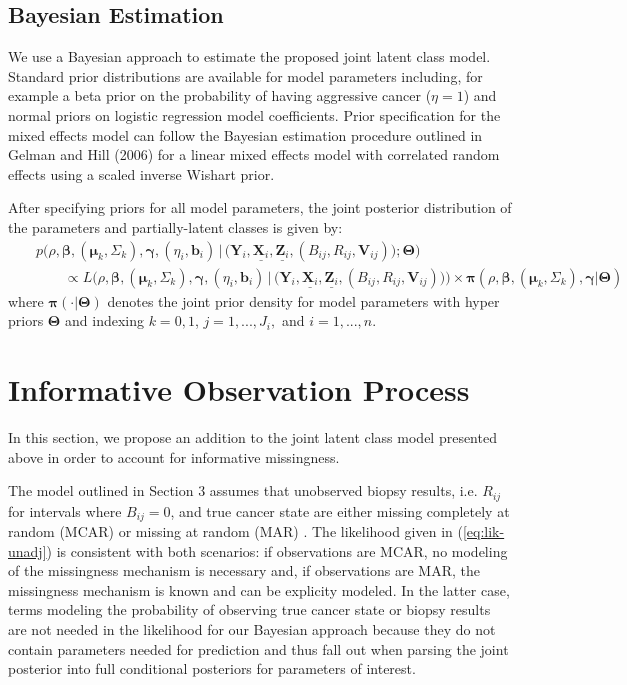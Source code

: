 \documentclass[12pt, letterpaper]{article}
\newcommand{\bmbeta}{\boldsymbol{\beta}}
\newcommand{\bmpi}{\boldsymbol{\pi}}
\newcommand{\bmmu}{\boldsymbol{\mu}}
\newcommand{\bmgamma}{\boldsymbol{\gamma}}
\newcommand{\bmY}{\mathbf{Y}}
\newcommand{\bmZ}{\mathbf{Z}}
\newcommand{\bmX}{\mathbf{X}}
\newcommand{\bmV}{\mathbf{V}}
\newcommand{\bmb}{\mathbf{b}}
\newcommand{\bmTheta}{\boldsymbol{\Theta}}
\newcommand{\beas}{\begin{eqnarray*}}
\newcommand{\eeas}{\end{eqnarray*}}
\newcommand{\mydots}{...}
\begin{document}
\subsection{Bayesian Estimation}

We use a Bayesian approach to estimate the proposed joint latent class model. Standard prior distributions are available for model parameters including, for example a beta prior on the probability of having aggressive cancer ($\eta=1$) and normal priors on logistic regression model coefficients. Prior specification for the mixed effects model can follow the Bayesian estimation procedure outlined in Gelman and Hill (2006) for a linear mixed effects model with correlated random effects using a scaled inverse Wishart prior\nocite{Gelman2006}. %

After specifying priors for all model parameters, the joint posterior distribution of the parameters and partially-latent classes is given by:
\beas
&& p\Big(\rho, \bmbeta, (\bmmu_k,\Sigma_k), \bmgamma, (\eta_i,\bmb_i) \,| \, \big( \bmY_i, \underline{\bmX_i}, \underline{\bmZ_i}, (B_{ij}, R_{ij}, \bmV_{ij}) \big); \bmTheta\Big) \\
&&\qquad  \propto L\Big(\rho,  \bmbeta, (\bmmu_k, \Sigma_k), \bmgamma, (\eta_i, \bmb_i)  \, | \,\big(\bmY_i, \underline{\bmX_i}, \underline{\bmZ_i}, (B_{ij}, R_{ij}, \bmV_{ij})\big) \Big) \times \bmpi(\rho,\bmbeta, (\bmmu_k, \Sigma_k), \bmgamma |\bmTheta)
\eeas
where $\bmpi(\cdot | \bmTheta)$ denotes the joint prior density for model parameters with hyper priors $\bmTheta$ and indexing $k=0,1$, $j=1,\mydots,J_i,$ and $i=1,\mydots,n$. 



\section{Informative Observation Process}
In this section, we propose an addition to the joint latent class model presented above in order to account for informative missingness. 

The model outlined in Section 3 assumes that unobserved biopsy results, i.e. $R_{ij}$ for intervals where $B_{ij}=0$, and true cancer state are either missing completely at random (MCAR) or missing at random (MAR) \cite{Little2014}. The likelihood given in (\ref{eq:lik-unadj}) is consistent with both scenarios: if observations are MCAR, no modeling of the missingness mechanism is necessary and, if observations are MAR, the missingness mechanism is known and can be explicity modeled. In the latter case, terms modeling the probability of observing true cancer state or biopsy results are not needed in the likelihood for our Bayesian approach because they do not contain parameters needed for prediction and thus fall out when parsing the joint posterior into full conditional posteriors for parameters of interest.
\end{document}
